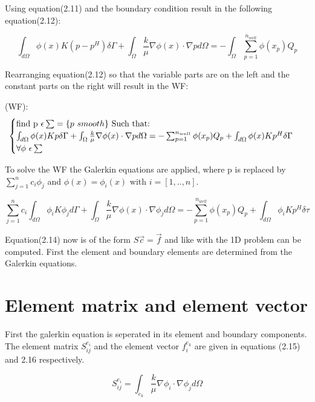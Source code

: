 \documentclass{report}
\begin{document}
Using equation(2.11) and the boundary condition result in the following equation(2.12):

\begin{equation}
	\int_{d\Omega}\phi(x)K(p-p^H)\delta\Gamma+\int_{\Omega}\frac{k}{\mu}\nabla\phi(x)\cdot\nabla p d\Omega= -\int_{\Omega}\sum_{p=1}^{n_{well}}\phi(x_p) Q_p
\end{equation}	

Rearranging equation(2.12) so that the variable parts are on the left and the constant parts on the right will result in the WF: \vspace{5mm}


(WF): \begin{equation}
		\begin{cases} 
			$find p $\epsilon \sum =\{p$ $ smooth\}$ Such that:$ \\
			\int_{d\Omega}\phi(x)Kp\delta\Gamma+\int_{\Omega}\frac{k}{\mu}\nabla\phi(x)\cdot\nabla p d\Omega= -\sum_{p=1}^{n_{well}}\phi(x_p) Q_p +\int_{d\Omega}\phi(x)Kp^H\delta\Gamma\\ \forall\phi $ $ \epsilon\sum 
		\end{cases}\  
	\end{equation}

To solve the WF the Galerkin equations are applied, where p is replaced by $ \sum_{j=1}^{n}c_i\phi_j $ and  $\phi(x)=\phi_i(x)$ with $i = [1,..,n]$.

\begin{equation}
	\sum_{j=1}^{n}c_i\int_{d\Omega}\phi_i K\phi_j d\Gamma + \int_{\Omega}\frac{k}{\mu}\nabla\phi(x)\cdot\nabla \phi_j d\Omega= -\sum_{p=1}^{n_{well}}\phi(x_p) Q_p +\int_{d\Omega}\phi_i Kp^H\delta\tau
\end{equation}

Equation(2.14) now is of the form $S\vec{c}=\vec{f}$ and like with the 1D problem can be computed. First the element and boundary elements are determined from the Galerkin equations.


\section{Element matrix and element vector}

First the galerkin equation is seperated in its element and boundary components. The element matrix $S^{e_i}_{ij}$ and the element vector $f^{e_k}_i$ are given in equations (2.15) and 2.16 respectively.

\begin{equation}
	S^{e_i}_{ij} = \int_{e_k}\frac{k}{\mu}\nabla\phi_i\cdot\nabla \phi_j d\Omega
\end{equation}
\end{document}
